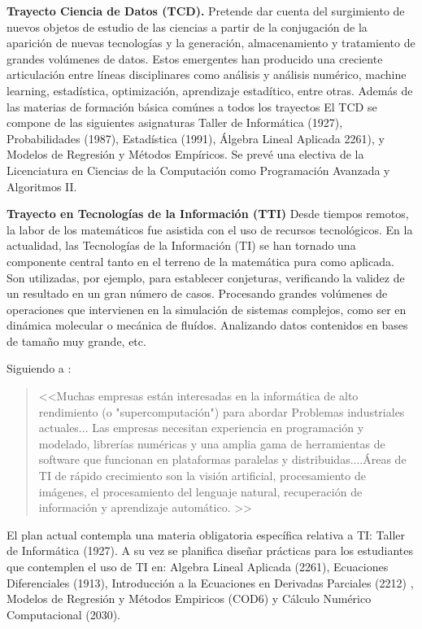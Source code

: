 \documentclass[a4paper, 12pt]{article}
\begin{document}
\begin{description}
\item{\textbf{Trayecto Ciencia de Datos (TCD).}}   Pretende dar cuenta del surgimiento de nuevos objetos de estudio de las ciencias a partir de la conjugación de la aparición de nuevas tecnologías y la generación, almacenamiento y tratamiento de grandes volúmenes de datos. Estos emergentes han producido una creciente articulación entre líneas disciplinares como análisis y análisis numérico, machine learning, estadística, optimización, aprendizaje
estadítico, entre otras. Además de las materias de formación básica comúnes a todos los trayectos El TCD se compone de las siguientes asignaturas Taller de Informática (1927), Probabilidades (1987), Estadística (1991), Álgebra Lineal Aplicada 2261),  y Modelos de Regresión y Métodos Empíricos.  Se prevé una electiva  de la Licenciatura en Ciencias de la Computación como Programación Avanzada y Algoritmos II. 




\item{\textbf{Trayecto en Tecnologías de la Información (TTI)}}  Desde tiempos remotos, la labor de los matemáticos fue asistida con el uso de  recursos tecnológicos. En la actualidad,  las Tecnologías de la Información (TI) se han tornado una componente central tanto en el terreno de la matemática pura como aplicada. Son utilizadas, por ejemplo, para establecer conjeturas, verificando la validez de un resultado en un gran número de casos.  Procesando grandes volúmenes de operaciones que intervienen en la simulación de sistemas complejos, como ser en dinámica molecular o mecánica de fluídos. Analizando datos contenidos en bases de tamaño muy grande, etc. 

Siguiendo a \cite{society2012siam}: 
\begin{quote}
<<Muchas empresas están interesadas en la informática de alto rendimiento (o "supercomputación") para abordar 
Problemas industriales actuales... Las empresas necesitan experiencia en programación y modelado, librerías numéricas
 y una amplia gama de herramientas de software que funcionan en plataformas paralelas y distribuidas....Áreas de TI de rápido crecimiento son la visión artificial, procesamiento de imágenes, el procesamiento del lenguaje natural, recuperación de información y aprendizaje automático. >>
\end{quote}

El plan actual contempla una materia obligatoria específica  relativa a TI: Taller de Informática (1927).  A su vez se planifica diseñar prácticas para los estudiantes que contemplen el uso de TI en:  Algebra Lineal Aplicada (2261), Ecuaciones Diferenciales (1913), Introducción a la Ecuaciones en Derivadas Parciales (2212) , Modelos de Regresión y Métodos Empiricos (COD6) y Cálculo Numérico Computacional (2030). 



\end{description}
\end{document}
